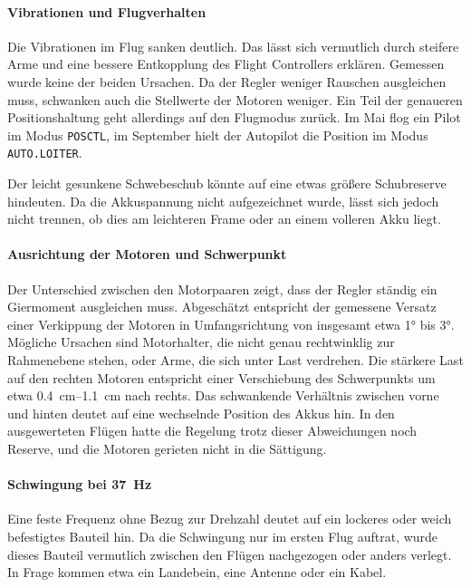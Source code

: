     \paragraph{Vibrationen und Flugverhalten}
    Die Vibrationen im Flug sanken deutlich.
    Das lässt sich vermutlich durch steifere Arme und eine bessere Entkopplung des Flight Controllers erklären.
    Gemessen wurde keine der beiden Ursachen.
    Da der Regler weniger Rauschen ausgleichen muss, schwanken auch die Stellwerte der Motoren weniger.
    Ein Teil der genaueren Positionshaltung geht allerdings auf den Flugmodus zurück.
    Im Mai flog ein Pilot im Modus \texttt{POSCTL}, im September hielt der Autopilot die Position im Modus
    \texttt{AUTO.LOITER}.

    Der leicht gesunkene Schwebeschub könnte auf eine etwas größere Schubreserve hindeuten.
    Da die Akkuspannung nicht aufgezeichnet wurde, lässt sich jedoch nicht trennen, ob dies am leichteren Frame oder an
    einem volleren Akku liegt.

    \paragraph{Ausrichtung der Motoren und Schwerpunkt}
    Der Unterschied zwischen den Motorpaaren zeigt, dass der Regler ständig ein Giermoment ausgleichen muss.
    Abgeschätzt entspricht der gemessene Versatz einer Verkippung der Motoren in Umfangsrichtung von insgesamt etwa
    \ang{1} bis \ang{3}.
    Mögliche Ursachen sind Motorhalter, die nicht genau rechtwinklig zur Rahmenebene stehen, oder Arme, die sich unter
    Last verdrehen.
    Die stärkere Last auf den rechten Motoren entspricht einer Verschiebung des Schwerpunkts um etwa
    \SIrange{0,4}{1,1}{\centi\metre} nach rechts.
    Das schwankende Verhältnis zwischen vorne und hinten deutet auf eine wechselnde Position des Akkus hin.
    In den ausgewerteten Flügen hatte die Regelung trotz dieser Abweichungen noch Reserve, und die Motoren gerieten
    nicht in die Sättigung.

    \paragraph{Schwingung bei \SI{37}{\hertz}}
    Eine feste Frequenz ohne Bezug zur Drehzahl deutet auf ein lockeres oder weich befestigtes Bauteil hin.
    Da die Schwingung nur im ersten Flug auftrat, wurde dieses Bauteil vermutlich zwischen den Flügen nachgezogen oder
    anders verlegt.
    In Frage kommen etwa ein Landebein, eine Antenne oder ein Kabel.

